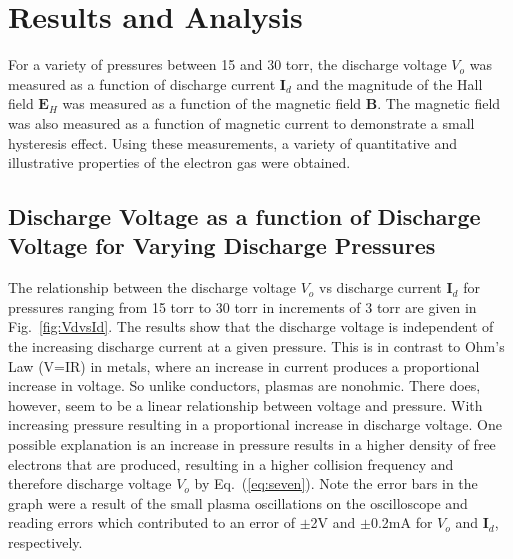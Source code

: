 \documentclass[%
 aip,
rsi,%
 amsmath,amssymb,
 reprint,%
author-numerical,%
]{revtex4-1}
\begin{document}
\section{Results and Analysis}
For a variety of pressures between 15 and 30 torr, the discharge voltage $V _ { o }$ was measured as a function of discharge current $\boldsymbol { I}_{d}$ and the magnitude of the Hall field $\boldsymbol { E } _ { H }$ was measured as a function of the magnetic field $\boldsymbol { B }$. The magnetic field was also measured as a function of magnetic current to demonstrate a small hysteresis effect. Using these measurements, a variety of quantitative and illustrative properties of the electron gas were obtained.

\subsection{Discharge Voltage as a function of Discharge Voltage for Varying Discharge Pressures}
The relationship between the discharge voltage $V _ { o }$ vs discharge current $\boldsymbol { I}_{d}$ for pressures ranging from 15 torr to 30 torr in increments of 3 torr are given in Fig.~\ref{fig:VdvsId}. The results show that the discharge voltage is independent of the increasing discharge current at a given pressure. This is in contrast to Ohm's Law (V=IR) in metals, where an increase in current produces a proportional increase in voltage. So unlike conductors, plasmas are nonohmic. There does, however, seem to be a linear relationship between voltage and pressure. With increasing pressure resulting in a proportional increase in discharge voltage. One possible explanation is an increase in pressure results in a higher density of free electrons that are produced, resulting in a higher collision frequency and therefore discharge voltage $V _ { o }$ by Eq.~(\ref{eq:seven}). Note the error bars in the graph were a result of the small plasma oscillations on the oscilloscope and reading errors which contributed to an error of $\pm$2V and $\pm$0.2mA for $V _ { o }$ and $\boldsymbol { I}_{d}$, respectively.
\end{document}
